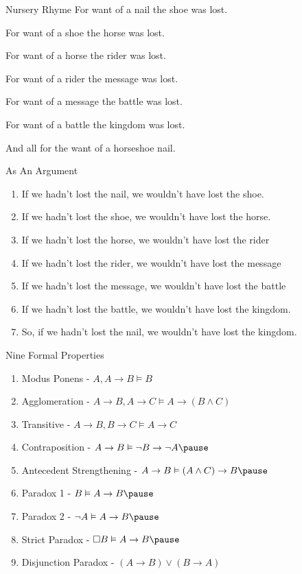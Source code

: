 \documentclass[
  ignorenonframetext,
]{beamer}
\providecommand{\tightlist}{%
  \setlength{\itemsep}{0pt}\setlength{\parskip}{0pt}}
\renewcommand{\,}{\text{, }}
\begin{document}
\begin{frame}{Nursery Rhyme}
\protect\hypertarget{nursery-rhyme}{}
For want of a nail the shoe was lost.

For want of a shoe the horse was lost.

For want of a horse the rider was lost.

For want of a rider the message was lost.

For want of a message the battle was lost.

For want of a battle the kingdom was lost.

And all for the want of a horseshoe nail.
\end{frame}

\begin{frame}{As An Argument}
\protect\hypertarget{as-an-argument}{}
\begin{enumerate}
\tightlist
\item
  If we hadn't lost the nail, we wouldn't have lost the shoe.
\item
  If we hadn't lost the shoe, we wouldn't have lost the horse.
\item
  If we hadn't lost the horse, we wouldn't have lost the rider
\item
  If we hadn't lost the rider, we wouldn't have lost the message
\item
  If we hadn't lost the message, we wouldn't have lost the battle
\item
  If we hadn't lost the battle, we wouldn't have lost the kingdom.
  \vspace{18pt}
\item
  So, if we hadn't lost the nail, we wouldn't have lost the kingdom.
\end{enumerate}
\end{frame}

\begin{frame}{Nine Formal Properties}
\protect\hypertarget{nine-formal-properties-1}{}
\begin{enumerate}
\tightlist
\item
  Modus Ponens - \(A, A \rightarrow B \vDash B\)
\item
  Agglomeration -
  \(A \rightarrow B, A \rightarrow C \vDash A \rightarrow (B \wedge C)\)
\item
  Transitive -
  \(A \rightarrow B, B \rightarrow C \vDash A \rightarrow C\)
\item
  Contraposition -
  \(A \rightarrow B \vDash \neg B \rightarrow \neg A \pause\)
\item
  Antecedent Strengthening -
  \(A \rightarrow B \vDash (A \wedge C) \rightarrow B \pause\)
\item
  Paradox 1 - \(B \vDash A \rightarrow B\pause\)
\item
  Paradox 2 - \(\neg A \vDash A \rightarrow B\pause\)
\item
  Strict Paradox - \(\Box B \vDash A \rightarrow B\pause\)
\item
  Disjunction Paradox - \((A \rightarrow B) \vee (B \rightarrow A)\)
\end{enumerate}
\end{frame}
\end{document}
